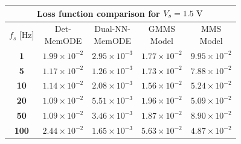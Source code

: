 \documentclass[lettersize,journal]{IEEEtran}
\begin{document}
\begin{table}
\begin{tabular}{c|cccc}
    \bottomrule
  \end{tabular}
  \begin{tabular}{c|cccc}
    \toprule
    \multicolumn{5}{c}{\textbf{Loss function comparison for \(V_s = 1.5 \rm \ V\)}}                                                                                                                  \\
    \midrule
    \(f_s\) [Hz] & \makecell{Det-                                                                                                                                                                    \\MemODE}             & \makecell{Dual-NN-                                                                                                             \\ MemODE}                 & \makecell{GMMS\\Model}             & \makecell{MMS\\Model}                                        \\
    \midrule
    \textbf{1}   & \(1.99 \times 10^{-2}\) & \color{ieeegreen} \bfseries \(2.95 \times 10^{-3}\) & \(1.77 \times 10^{-2}\)                           & \color{ieeered} \bfseries \(9.95 \times 10^{-2}\) \\
    \textbf{5}   & \(1.17 \times 10^{-2}\) & \color{ieeegreen} \bfseries \(1.26 \times 10^{-3}\) & \(1.73 \times 10^{-2}\)                           & \color{ieeered} \bfseries \(7.88 \times 10^{-2}\) \\
    \textbf{10}  & \(1.14 \times 10^{-2}\) & \color{ieeegreen} \bfseries \(2.08 \times 10^{-3}\) & \(1.56 \times 10^{-2}\)                           & \color{ieeered} \bfseries \(5.24 \times 10^{-2}\) \\
    \textbf{20}  & \(1.09 \times 10^{-2}\) & \color{ieeegreen} \bfseries \(5.51 \times 10^{-3}\) & \(1.96 \times 10^{-2}\)                           & \color{ieeered} \bfseries \(5.09 \times 10^{-2}\) \\
    \textbf{50}  & \(1.09 \times 10^{-2}\) & \color{ieeegreen} \bfseries \(3.46 \times 10^{-3}\) & \(1.87 \times 10^{-2}\)                           & \color{ieeered} \bfseries \(8.90 \times 10^{-2}\) \\
    \textbf{100} & \(2.44 \times 10^{-2}\) & \color{ieeegreen} \(1.65 \times 10^{-3}\)           & \color{ieeered} \bfseries \(5.63 \times 10^{-2}\) & \(4.87 \times 10^{-2}\)                           \\
    \bottomrule
  \end{tabular}
\end{table}
\end{document}
